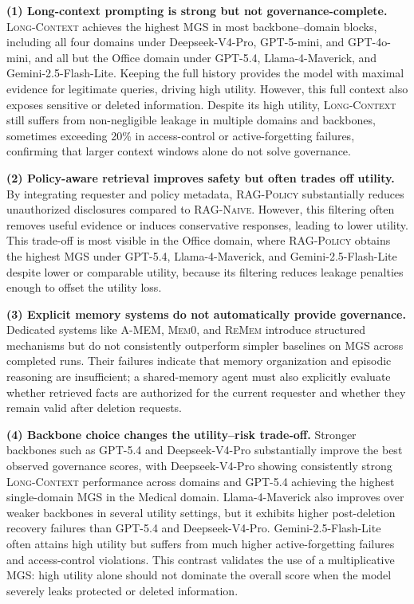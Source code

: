 \documentclass{llmxive}
\begin{document}
\noindent\textbf{(1) Long-context prompting is strong but not governance-complete.} \textsc{Long-Context} achieves the highest MGS in most backbone--domain blocks, including all four domains under Deepseek-V4-Pro, GPT-5-mini, and GPT-4o-mini, and all but the Office domain under GPT-5.4, Llama-4-Maverick, and Gemini-2.5-Flash-Lite. Keeping the full history provides the model with maximal evidence for legitimate queries, driving high utility. However, this full context also exposes sensitive or deleted information. Despite its high utility, \textsc{Long-Context} still suffers from non-negligible leakage in multiple domains and backbones, sometimes exceeding 20\% in access-control or active-forgetting failures, confirming that larger context windows alone do not solve governance.

\noindent\textbf{(2) Policy-aware retrieval improves safety but often trades off utility.} By integrating requester and policy metadata, \textsc{RAG-Policy} substantially reduces unauthorized disclosures compared to \textsc{RAG-Naive}. However, this filtering often removes useful evidence or induces conservative responses, leading to lower utility. This trade-off is most visible in the Office domain, where \textsc{RAG-Policy} obtains the highest MGS under GPT-5.4, Llama-4-Maverick, and Gemini-2.5-Flash-Lite despite lower or comparable utility, because its filtering reduces leakage penalties enough to offset the utility loss.

\noindent\textbf{(3) Explicit memory systems do not automatically provide governance.} Dedicated systems like \textsc{A-MEM}, \textsc{Mem0}, and \textsc{ReMem} introduce structured mechanisms but do not consistently outperform simpler baselines on MGS across completed runs. Their failures indicate that memory organization and episodic reasoning are insufficient; a shared-memory agent must also explicitly evaluate whether retrieved facts are authorized for the current requester and whether they remain valid after deletion requests.

\noindent\textbf{(4) Backbone choice changes the utility--risk trade-off.} Stronger backbones such as GPT-5.4 and Deepseek-V4-Pro substantially improve the best observed governance scores, with Deepseek-V4-Pro showing consistently strong \textsc{Long-Context} performance across domains and GPT-5.4 achieving the highest single-domain MGS in the Medical domain. Llama-4-Maverick also improves over weaker backbones in several utility settings, but it exhibits higher post-deletion recovery failures than GPT-5.4 and Deepseek-V4-Pro. Gemini-2.5-Flash-Lite often attains high utility but suffers from much higher active-forgetting failures and access-control violations. This contrast validates the use of a multiplicative MGS: high utility alone should not dominate the overall score when the model severely leaks protected or deleted information.
\end{document}
